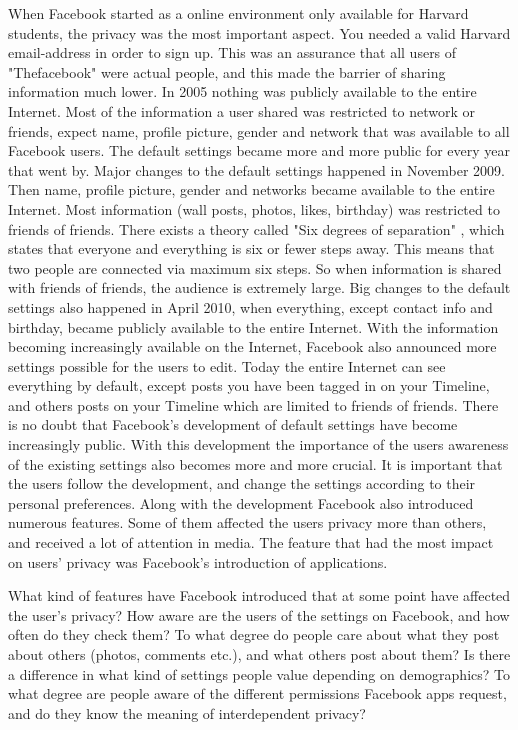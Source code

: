 When Facebook started as a online environment only available for Harvard students, the privacy was the most important aspect. You needed a valid Harvard email-address in order to sign up. This was an assurance that all users of "Thefacebook" were actual people, and this made the barrier of sharing information much lower. In 2005 nothing was publicly available to the entire Internet. Most of the information a user shared was restricted to network or friends, expect name, profile picture, gender and network that was available to all Facebook users. The default settings became more and more public for every year that went by. Major changes to the default settings happened in November 2009. Then name, profile picture, gender and networks became available to the entire Internet. Most information (wall posts, photos, likes, birthday) was restricted to friends of friends. There exists a theory called "Six degrees of separation" \cite{six}, which states that everyone and everything is six or fewer steps away. This means that two people are connected via maximum six steps. So when information is shared with friends of friends, the audience is extremely large. Big changes to the default settings also happened in April 2010, when everything, except contact info and birthday, became publicly available to the entire Internet. With the information becoming increasingly available on the Internet, Facebook also announced more settings possible for the users to edit. Today the entire Internet can see everything by default, except posts you have been tagged in on your Timeline, and others posts on your Timeline which are limited to friends of friends. There is no doubt that Facebook's development of default settings have become increasingly public. With this development the importance of the users awareness of the existing settings also becomes more and more crucial. It is important that the users follow the development, and change the settings according to their personal preferences. Along with the development Facebook also introduced numerous features. Some of them affected the users privacy more than others, and received a lot of attention in media. The feature that had the most impact on users' privacy was Facebook's introduction of applications. 




What kind of features have Facebook introduced that at some point have affected the user's privacy?
How aware are the users of the settings on Facebook, and how often do they check them?
To what degree do people care about what they post about others (photos, comments etc.), and what others post about them? 
Is there a difference in what kind of settings people value depending on  demographics?
To what degree are people aware of the different permissions Facebook apps request, and do they know the meaning of interdependent privacy?



